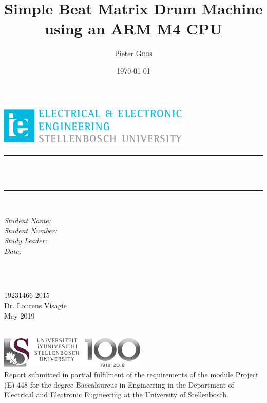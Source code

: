 \documentclass[12pt,a4paper]{report}
\title{Simple Beat Matrix Drum Machine \\ using an ARM M4 CPU} %
\author{Pieter \textsc{Goos}} %
\date{\today} %
\makeatletter
\let\thetitle\@title
\let\theauthor\@author
\makeatother
\begin{document}
\begin{titlepage}
    \centering
    \vspace*{0.5 cm}
    \includegraphics[scale = 2]{EELogo.png}\\[1.0 cm]   %
    \vspace{3cm}
    \rule{\linewidth}{0.2 mm} \\[0.4 cm]
    { \huge \bfseries \thetitle }\\[0.4 cm]
    \rule{\linewidth}{0.2 mm} \\[1.5 cm]
    \vspace{2cm}
	\begin{minipage}{6.5cm}
		\begin{flushleft} \large
			\emph{Student Name:}\\
			\emph{Student Number:}\\
			\emph{Study Leader:}\\
			\emph{Date:}
		\end{flushleft}
	\end{minipage}~
	\begin{minipage}{6.5cm}
		\begin{flushright} \large
		\theauthor\\
		19231466-2015\\
		Dr. Lourens Visagie\\
		May 2019
		\end{flushright}
	\end{minipage}\\[2 cm]
    \vfill
    \includegraphics[width=7cm]{SUNLogo.jpg}\\[1.0 cm]
    Report submitted in partial fulfilment of the requirements of the module Project (E) 448 for the degree Baccalaureus in Engineering in the Department of Electrical and Electronic Engineering at the University of Stellenbosch.
    
\end{titlepage}

\end{document}

